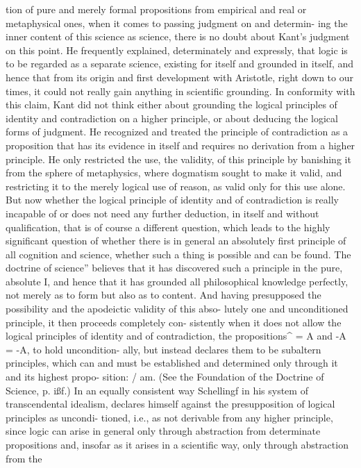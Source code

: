 tion of pure and merely formal propositions from empirical and real or
metaphysical ones, when it comes to passing judgment on and determin-
ing the inner content of this science as science, there is no doubt about
Kant's judgment on this point. He frequently explained, determinately
and expressly, that logic is to be regarded as a separate science, existing
for itself and grounded in itself, and hence that from its origin and first
development with Aristotle, right down to our times, it could not really gain
anything in scientific grounding. In conformity with this claim, Kant did
not think either about grounding the logical principles of identity and
contradiction on a higher principle, or about deducing the logical forms of
judgment. He recognized and treated the principle of contradiction as a
proposition that has its evidence in itself and requires no derivation from a
higher principle. He only restricted the use, the validity, of this principle
by banishing it from the sphere of metaphysics, where dogmatism sought
to make it valid, and restricting it to the merely logical use of reason, as
valid only for this use alone.
But now whether the logical principle of identity and of contradiction is
really incapable of or does not need any further deduction, in itself and
without qualification, that is of course a different question, which leads to
the highly significant question of whether there is in general an absolutely
first principle of all cognition and science, whether such a thing is possible
and can be found.
The doctrine of science'' believes that it has discovered such a principle in
the pure, absolute I, and hence that it has grounded all philosophical
knowledge perfectly, not merely as to form but also as to content. And
having presupposed the possibility and the apodeictic validity of this abso-
lutely one and unconditioned principle, it then proceeds completely con-
sistently when it does not allow the logical principles of identity and of
contradiction, the propositions^ = A and -A = -A, to hold uncondition-
ally, but instead declares them to be subaltern principles, which can and
must be established and determined only through it and its highest propo-
sition: / am. (See the Foundation of the Doctrine of Science, p. ißf.) In an
equally consistent way Schellingf in his system of transcendental idealism,
declares himself against the presupposition of logical principles as uncondi-
tioned, i.e., as not derivable from any higher principle, since logic can arise
in general only through abstraction from determinate propositions and,
insofar as it arises in a scientific way, only through abstraction from the
